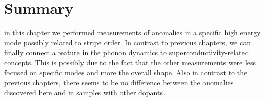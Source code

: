 \section{Summary}
in this chapter we performed measurements of anomalies in a specific high energy mode possibly related to stripe order. In contrast to previous chapters, we can finally connect a feature in the phonon dynamics to superconductivity-related concepts. This is possibly due to the fact that the other measurements were less focused on specific modes and more the overall shape. Also in contrast to the previous chapters, there seems to be no difference between the anomalies discovered here and in samples with other dopants.





